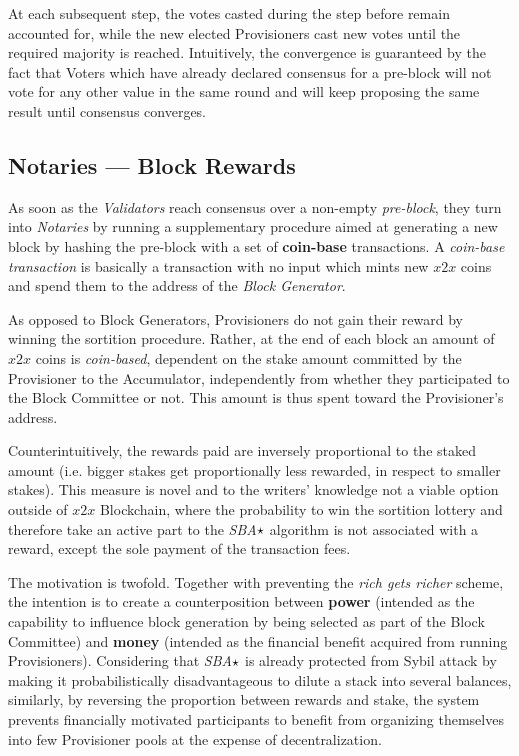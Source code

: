 At each subsequent step, the votes casted during the step before remain
accounted for, while the new elected Provisioners cast new votes until
the required majority is reached. Intuitively, the convergence is
guaranteed by the fact that Voters which have already declared consensus
for a pre-block will not vote for any other value in the same round and
will keep proposing the same result until consensus converges.

\subsection{Notaries --- Block Rewards}
\label{sec:Block-Reward}

As soon as the \emph{Validators} reach consensus over a non-empty
\emph{pre-block}, they turn into \emph{Notaries} by running a
supplementary procedure aimed at generating a new block by hashing the
pre-block with a set of \textbf{coin-base} transactions. A
\emph{coin-base transaction} is basically a transaction with no input
which mints new \(x2x\) coins and spend them to the address of the
\emph{Block Generator}.

As opposed to Block Generators, Provisioners do not gain their reward by
winning the sortition procedure. Rather, at the end of each block an
amount of \(x2x\) coins is \emph{coin-based}, dependent on the stake
amount committed by the Provisioner to the Accumulator, independently
from whether they participated to the Block Committee or not. This
amount is thus spent toward the Provisioner's address.

Counterintuitively, the rewards paid are inversely proportional to the
staked amount (i.e. bigger stakes get proportionally less rewarded, in
respect to smaller stakes). This measure is novel and to the writers'
knowledge not a viable option outside of \(x2x\) Blockchain, where the
probability to win the sortition lottery and therefore take an active
part to the \emph{SBA}\(\large\star\) algorithm is not associated with a
reward, except the sole payment of the transaction fees.

The motivation
is twofold. Together with preventing the \emph{rich gets richer} scheme,
the intention is to create a counterposition between \textbf{power}
(intended as the capability to influence block generation by being
selected as part of the Block Committee) and \textbf{money} (intended as
the financial benefit acquired from running Provisioners). Considering
that \emph{SBA}\(\large\star\) is already protected from Sybil attack by
making it probabilistically disadvantageous to dilute a stack into
several balances, similarly, by reversing the proportion between rewards
and stake, the system prevents financially motivated participants to
benefit from organizing themselves into few Provisioner pools at the
expense of decentralization.

